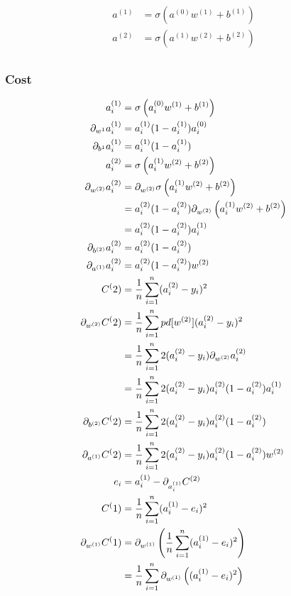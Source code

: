 \documentclass{article}
\begin{document}
\begin{align}
	a^{(1)} &= \sigma\left(a^{(0)}w^{(1)} + b^{(1)}\right) \\	
	a^{(2)} &= \sigma\left(a^{(1)}w^{(2)} + b^{(2)}\right) \\
\end{align}

\subsubsection{Cost}

\begin{align}
	a_i^{(1)} &= \sigma\left(a_i^{(0)}w^{(1)} + b^{(1)}\right) \\	
	\pd[w^{1}]a_i^{(1)} 
		&= a_i^{(1)}(1 - a_i^{(1)}) a_i^{(0)}\\ 
	\pd[b^{1}]a_i^{(1)} 
		&= a_i^{(1)}(1 - a_i^{(1)}) \\ 
	a_i^{(2)} &= \sigma\left(a_i^{(1)}w^{(2)} + b^{(2)}\right) \\
	\pd[w^{(2)}]a_i^{(2)} 
		&= \pd[w^{(2)}] \sigma\left(a_i^{(1)}w^{(2)} + b^{(2)}\right) \\	
		&= a_i^{(2)}(1 - a_i^{(2)}) \pd[w^{(2)}] \left(a_i^{(1)}w^{(2)} + b^{(2)}\right) \\	
		&= a_i^{(2)}(1 - a_i^{(2)}) a_i^{(1)} \\	
	\pd[b^{(2)}]a_i^{(2)} 
		&= a_i^{(2)}(1 - a_i^{(2)}) \\	
	\pd[a^{(1)}]a_i^{(2)} 
		&= a_i^{(2)}(1 - a_i^{(2)})w^{(2)} \\	
	C^(2) &= \avgsum[i, n] (a_i^{(2)} - y_i)^2 \\
	\pd[w^{(2)}]C^(2)  
		&= \avgsum[i, n] pd[w^{(2)}](a_i^{(2)} - y_i)^2 \\
		&= \avgsum[i, n] 2(a_i^{(2)} - y_i) \pd[w^{(2)}]a_i^{(2)} \\
		&= \avgsum[i, n] 2(a_i^{(2)} - y_i) a_i^{(2)}(1 - a_i^{(2)}) a_i^{(1)} \\
	\pd[b^{(2)}]C^(2)  
		&= \avgsum[i, n] 2(a_i^{(2)} - y_i) a_i^{(2)}(1 - a_i^{(2)}) \\
	\pd[a^{(1)}]C^(2)  
		&= \avgsum[i, n] 2(a_i^{(2)} - y_i) a_i^{(2)}(1 - a_i^{(2)}) w^{(2)} \\
	e_i &= a_i^{(1)} - \pd[a_i^{(1)}]C^{(2)} \\
	C^(1) &= \avgsum[i, n] (a_i^{(1)} - e_i)^2 \\
	\pd[w^{(1)}]C^(1)  
		&= \pd[w^{(1)}]\left(\avgsum[i, n] (a_i^{(1)} - e_i)^2\right) \\
		&= \avgsum[i, n] \pd[w^{(1)}]\left((a_i^{(1)} - e_i)^2\right) \\

\end{align}
\end{document}
